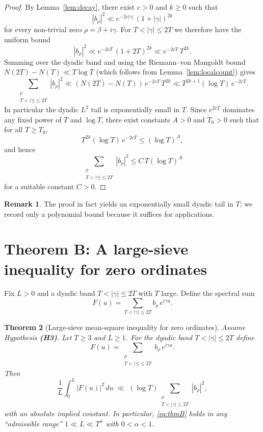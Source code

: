 \documentclass[11pt]{article}
\theoremstyle{plain}
\newtheorem{theorem}{Theorem}[section]
\theoremstyle{definition}
\newtheorem{remark}[theorem]{Remark}
\begin{document}
\begin{proof}
By Lemma~\ref{lem:decay}, there exist $c>0$ and $k\ge 0$ such that
\[
  |b_\rho|^2 \ll e^{-2c|\gamma|}\,(1+|\gamma|)^{2k}
\]
for every non-trivial zero $\rho=\beta+i\gamma$.
For $T<|\gamma|\le 2T$ we therefore have the uniform bound
\[
  |b_\rho|^2 \ll e^{-2cT}\,(1+2T)^{2k} \ll e^{-2cT}\,T^{2k}.
\]
Summing over the dyadic band and using the Riemann--von Mangoldt bound
$N(2T)-N(T)\ll T\log T$ (which follows from Lemma~\ref{lem:localcount}) gives
\[
  \sum_{\substack{\rho\\ T<|\gamma|\le 2T}} |b_\rho|^2
  \ll (N(2T)-N(T))\, e^{-2cT}\,T^{2k}
  \ll T^{2k+1}(\log T)\,e^{-2cT}.
\]
In particular the dyadic $L^2$ tail is exponentially small in $T$.
Since $e^{2cT}$ dominates any fixed power of $T$ and $\log T$, there exist constants
$A>0$ and $T_0>0$ such that for all $T\ge T_0$,
\[
  T^{2k}(\log T)\,e^{-2cT} \le (\log T)^A,
\]
and hence
\[
  \sum_{\substack{\rho\\ T<|\gamma|\le 2T}} |b_\rho|^2 \le C\,T(\log T)^A
\]
for a suitable constant $C>0$.
\end{proof}
\begin{remark}
The proof in fact yields an exponentially small dyadic tail in $T$; we record only a polynomial bound because it suffices for applications.
\end{remark}

\section{Theorem B: A large-sieve inequality for zero ordinates}
Fix $L>0$ and a dyadic band $T<|\gamma|\le 2T$ with $T$ large. Define the spectral sum
\[
  F(u) = \sum_{T<|\gamma|\le 2T} b_\rho\, e^{i\gamma u}.
\]

\begin{theorem}[Large-sieve mean-square inequality for zero ordinates]\label{thm:B}
Assume Hypothesis \textbf{(H3)}. Let $T\ge 3$ and $L\ge 1$. For the dyadic band $T<|\gamma|\le 2T$ define
\[
  F(u) = \sum_{\substack{\rho\\ T<|\gamma|\le 2T}} b_\rho\, e^{i\gamma u}.
\]
Then
\begin{equation}\label{eq:thmB}
  \frac{1}{L} \int_0^L |F(u)|^2 \, du
    \;\ll\; (\log T)\sum_{\substack{\rho\\ T<|\gamma|\le 2T}} |b_\rho|^2,
\end{equation}
with an absolute implied constant. In particular, \eqref{eq:thmB} holds in any ``admissible range'' $1\ll L\ll T^\alpha$ with $0<\alpha<1$.
\end{theorem}
\end{document}
